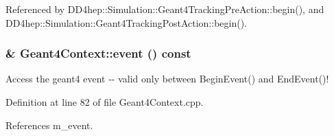 Referenced by DD4hep::Simulation::Geant4TrackingPreAction::begin(), and DD4hep::Simulation::Geant4TrackingPostAction::begin().\hypertarget{class_d_d4hep_1_1_simulation_1_1_geant4_context_a425ebf810e3efadac1059f912adfd9f3}{
\subsubsection[{event}]{ \& Geant4Context::event () const}}
\label{class_d_d4hep_1_1_simulation_1_1_geant4_context_a425ebf810e3efadac1059f912adfd9f3}


Access the geant4 event -\/-\/ valid only between BeginEvent() and EndEvent()! 

Definition at line 82 of file Geant4Context.cpp.

References m\_\-event.

